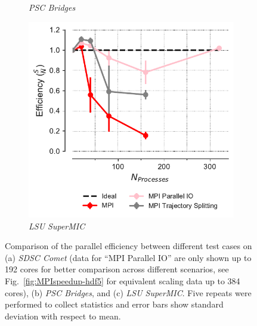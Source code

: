 \begin{figure}[!htb]
\begin{subfigure}{.35\textwidth}
    \caption{\emph{PSC Bridges}}
    \label{fig:comparison_efficiency_Bridges}
  \end{subfigure}
  \hfill
  \begin{subfigure}{.3\textwidth}
    \includegraphics[width=\linewidth]{figures/Comparison_Efficiency_all_SuperMIC.pdf}
    \caption{\emph{LSU SuperMIC}}
    \label{fig:comparison_efficiency_SuperMIC}
  \end{subfigure}
  \caption{Comparison of the parallel efficiency between different test cases on (a) \emph{SDSC Comet} (data for ``MPI Parallel IO'' are only shown up to 192 cores for better comparison across different scenarios, see Fig.~\protect\ref{fig:MPIspeedup-hdf5} for equivalent scaling data up to 384 cores), (b) \emph{PSC Bridges}, and (c) \emph{LSU SuperMIC}.
    Five repeats were performed to collect statistics and error bars show standard deviation with respect to mean.}
  \label{fig:comparison_efficiency_clusters}
\end{figure} 

